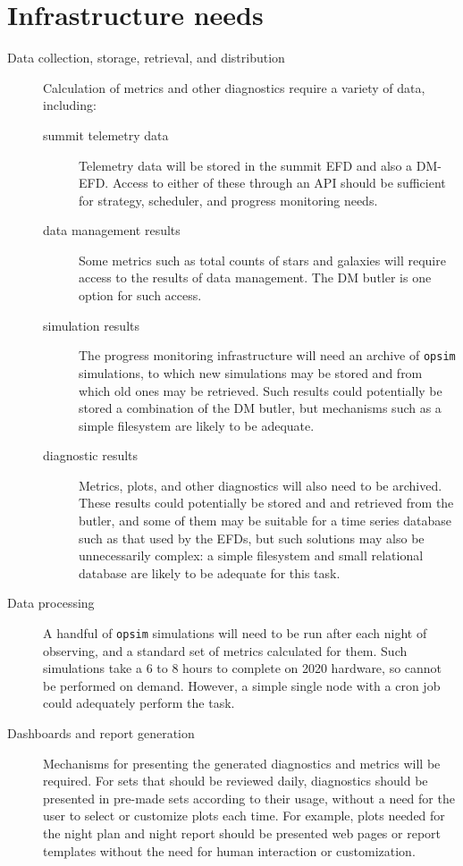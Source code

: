\section{Infrastructure needs}
\label{sec:orgbd28fe5}
\begin{description}
\item[{Data collection, storage, retrieval, and distribution}] Calculation of metrics and other diagnostics require a variety of data, including:
\begin{description}
\item[{summit telemetry data}] Telemetry data will be stored in the summit EFD and also a DM-EFD. Access to either of these through an API should be sufficient for strategy, scheduler, and progress monitoring needs.
\item[{data management results}] Some metrics such as total counts of stars and galaxies will require access to the results of data management. The DM butler is one option for such access.
\item[{simulation results}] The progress monitoring infrastructure will need an archive of \texttt{opsim} simulations, to which new simulations may be stored and from which old ones may be retrieved. Such results could potentially be stored a combination of the DM butler, but mechanisms such as a simple filesystem are likely to be adequate.
\item[{diagnostic results}] Metrics, plots, and other diagnostics will also need to be archived. These results could potentially be stored and and retrieved from the butler, and some of them may be suitable for a time series database such as that used by the EFDs, but such solutions may also be unnecessarily complex: a simple filesystem and small relational database are likely to be adequate for this task.
\end{description}
\item[{Data processing}] A handful of \texttt{opsim} simulations will need to be run after each night of observing, and a standard set of metrics calculated for them. Such simulations take a 6 to 8 hours to complete on 2020 hardware, so cannot be performed on demand. However, a simple single node with a cron job could adequately perform the task.
\item[{Dashboards and report generation}] Mechanisms for presenting the generated diagnostics and metrics will be required. For sets that should be reviewed daily, diagnostics  should be presented in pre-made sets according to their usage, without a need for the user to select or customize plots each time. For example, plots needed for the night plan and night report should be presented web pages or report templates without the need for human interaction or customization.
\end{description}

